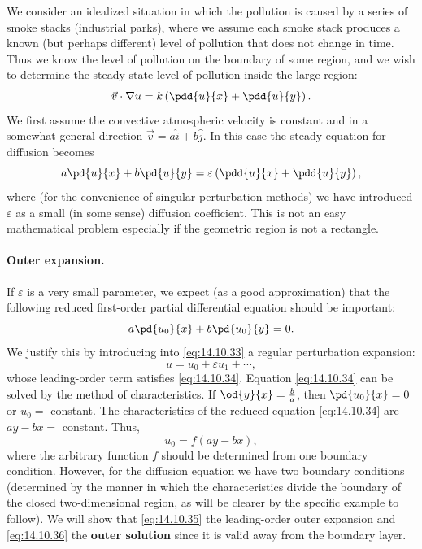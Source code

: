 We consider an idealized situation in which the pollution is caused by a series of smoke stacks (industrial parks), where we assume each smoke stack produces a known (but perhaps different) level of pollution that does not change in time. Thus we know the level of pollution on the boundary of some region, and we wish to determine the steady-state level of pollution inside the large region:
\begin{equation}
\vec{v}\cdot\nabla u = k\left(\pdd{u}{x} + \pdd{u}{y}\right).
\label{eq:14.10.32}
\end{equation}
We first assume the convective atmospheric velocity is constant and in a somewhat general direction $\vec{v} = a\hat{i} + b\hat{j}$. In this case the steady equation for diffusion becomes
\begin{equation}
a\pd{u}{x} + b\pd{u}{y} = \varepsilon\left(\pdd{u}{x} + \pdd{u}{y}\right),
\label{eq:14.10.33}
\end{equation}
where (for the convenience of singular perturbation methods) we have introduced $\varepsilon$ as a small (in some sense) diffusion coefficient. This is not an easy mathematical problem especially if the geometric region is not a rectangle.

\paragraph{Outer expansion.}
If $\varepsilon$ is a very small parameter, we expect (as a good approximation) that the following reduced first-order partial differential equation should be important:
\begin{equation}
a\pd{u_0}{x} + b\pd{u_0}{y} = 0.
\label{eq:14.10.34}
\end{equation}
We justify this by introducing into \eqref{eq:14.10.33} a regular perturbation expansion:
\begin{equation}
u = u_0 + \varepsilon u_1 + \cdots,
\label{eq:14.10.35}
\end{equation}
whose leading-order term satisfies \eqref{eq:14.10.34}. Equation \eqref{eq:14.10.34} can be solved by the method of characteristics. If $\od{y}{x} = \frac{b}{a}$, then $\pd{u_0}{x} = 0$ or $u_0 = $ constant. The characteristics of the reduced equation \eqref{eq:14.10.34} are $ay - bx = $ constant. Thus,
\begin{equation}
u_0 = f(ay - bx),
\label{eq:14.10.36}
\end{equation}
where the arbitrary function $f$ should be determined from one boundary condition. However, for the diffusion equation we have two boundary conditions (determined by the manner in which the characteristics divide the boundary of the closed two-dimensional region, as will be clearer by the specific example to follow). We will show that \eqref{eq:14.10.35} the leading-order outer expansion and \eqref{eq:14.10.36} the \textbf{outer solution} since it is valid away from the boundary layer.

